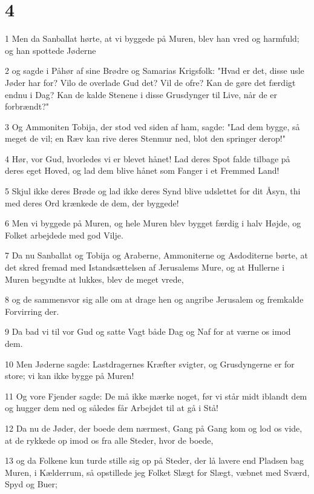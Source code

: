 \chapter{4}

\par 1 Men da Sanballat hørte, at vi byggede på Muren, blev han vred og harmfuld; og han spottede Jøderne
\par 2 og sagde i Påhør af sine Brødre og Samarias Krigsfolk: "Hvad er det, disse usle Jøder har for? Vilo de overlade Gud det? Vil de ofre? Kan de gøre det færdigt endnu i Dag? Kan de kalde Stenene i disse Grusdynger til Live, når de er forbrændt?"
\par 3 Og Ammoniten Tobija, der stod ved siden af ham, sagde: "Lad dem bygge, så meget de vil; en Ræv kan rive deres Stenmur ned, blot den springer derop!"
\par 4 Hør, vor Gud, hvorledes vi er blevet hånet! Lad deres Spot falde tilbage på deres eget Hoved, og lad dem blive hånet som Fanger i et Fremmed Land!
\par 5 Skjul ikke deres Brøde og lad ikke deres Synd blive udslettet for dit Åsyn, thi med deres Ord krænkede de dem, der byggede!
\par 6 Men vi byggede på Muren, og hele Muren blev bygget færdig i halv Højde, og Folket arbejdede med god Vilje.
\par 7 Da nu Sanballat og Tobija og Araberne, Ammoniterne og Asdoditerne børte, at det skred fremad med Istandsættelsen af Jerusalems Mure, og at Hullerne i Muren begyndte at lukkes, blev de meget vrede,
\par 8 og de sammensvor sig alle om at drage hen og angribe Jerusalem og fremkalde Forvirring der.
\par 9 Da bad vi til vor Gud og satte Vagt både Dag og Naf for at værne os imod dem.
\par 10 Men Jøderne sagde: Lastdragernes Kræfter svigter, og Grusdyngerne er for store; vi kan ikke bygge på Muren!
\par 11 Og vore Fjender sagde: De må ikke mærke noget, før vi står midt iblandt dem og hugger dem ned og således får Arbejdet til at gå i Stå!
\par 12 Da nu de Jøder, der boede dem nærmest, Gang på Gang kom og lod os vide, at de rykkede op imod os fra alle Steder, hvor de boede,
\par 13 og da Folkene kun turde stille sig op på Steder, der lå lavere end Pladsen bag Muren, i Kælderrum, så opstillede jeg Folket Slægt for Slægt, væbnet med Sværd, Spyd og Buer;

